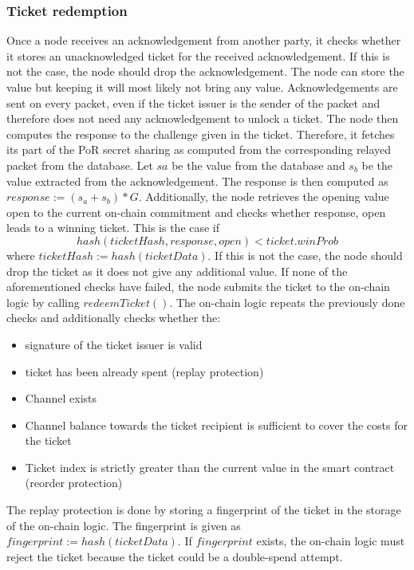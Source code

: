 \subsubsection{Ticket redemption}
Once a node receives an acknowledgement from another party, it checks whether it stores an unacknowledged ticket for the received acknowledgement. 
If this is not the case, the node should drop the acknowledgement. The node can store the value but keeping it will most likely not bring any value. 
\newline Acknowledgements are sent on every packet, even if the ticket issuer is the sender of the packet and therefore does not need any acknowledgement to unlock a ticket.
The node then computes the response to the challenge given in the ticket. Therefore, it fetches its part of the PoR secret sharing as computed from the corresponding relayed packet from the database. 
\newline Let $sa$ be the value from the database and $s_b$ be the value extracted from the acknowledgement. The response is then computed as $response:=(s_a+s_b)*G$.
Additionally, the node retrieves the opening value open to the current on-chain commitment and checks whether response, open leads to a winning ticket. 
This is the case if $$hash( ticketHash, response, open ) <ticket.winProb$$ where $ticketHash:=hash( ticketData )$.
If this is not the case, the node should drop the ticket as it does not give any additional value.
\newline If none of the aforementioned checks have failed, the node submits the ticket to the on-chain logic by calling $redeemTicket()$. 
The on-chain logic repeats the previously done checks and additionally checks whether the:
\begin{itemize}
    \item signature of the ticket issuer is valid
    \item ticket has been already spent (replay protection)
    \item Channel exists
    \item Channel balance towards the ticket recipient is sufficient to cover the costs for the ticket
    \item Ticket index is strictly greater than the current value in the smart contract (reorder protection)
\end{itemize}
The replay protection is done by storing a fingerprint of the ticket in the storage of the on-chain logic. 
The fingerprint is given as $fingerprint:=hash( ticketData )$. If $fingerprint$ exists, the on-chain logic must reject the ticket because the ticket could be a double-spend attempt.
